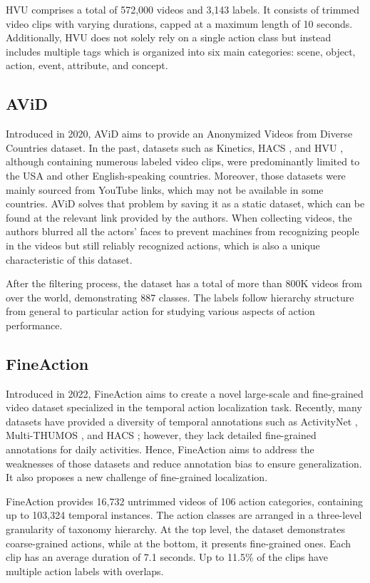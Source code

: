 \documentclass[a4paper]{article}
\begin{document}
HVU comprises a total of 572,000 videos and 3,143 labels. It consists of trimmed video clips with varying durations, capped at a maximum length of 10 seconds. Additionally, HVU does not solely rely on a single action class but instead includes multiple tags which is organized into six main categories: scene, object, action, event, attribute, and concept.
\subsection{AViD}
Introduced in 2020, AViD \cite{AViD} aims to provide an Anonymized Videos from Diverse Countries dataset. In the past, datasets such as Kinetics, HACS \cite{HACS}, and HVU \cite{HVU}, although containing numerous labeled video clips, were predominantly limited to the USA and other English-speaking countries. Moreover, those datasets were mainly sourced from YouTube links, which may not be available in some countries. AViD solves that problem by saving it as a static dataset, which can be found at the relevant link provided by the authors. When collecting videos, the authors blurred all the actors' faces to prevent machines from recognizing people in the videos but still reliably recognized actions, which is also a unique characteristic of this dataset.

After the filtering process, the dataset has a total of more than 800K videos from over the world, demonstrating 887 classes. The labels follow hierarchy structure from general to particular action for studying various aspects of action performance.
\subsection{FineAction}
Introduced in 2022, FineAction \cite{FineAction} aims to create a novel large-scale and fine-grained video dataset specialized in the temporal action localization task. Recently, many datasets have provided a diversity of temporal annotations such as ActivityNet \cite{ActivityNet}, Multi-THUMOS \cite{Multi-THUMOS}, and HACS \cite{HACS}; however, they lack detailed fine-grained annotations for daily activities. Hence, FineAction aims to address the weaknesses of those datasets and reduce annotation bias to ensure generalization. It also proposes a new challenge of fine-grained localization.
 
FineAction provides 16,732 untrimmed videos of 106 action categories, containing up to 103,324 temporal instances. The action classes are arranged in a three-level granularity of taxonomy hierarchy. At the top level, the dataset demonstrates coarse-grained actions, while at the bottom, it presents fine-grained ones. Each clip has an average duration of 7.1 seconds. Up to 11.5\% of the clips have multiple action labels with overlaps.
\end{document}
